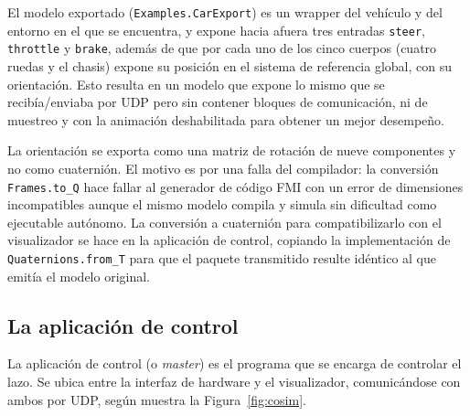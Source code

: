 El modelo exportado (\verb|Examples.CarExport|) es un wrapper del vehículo y del entorno en el que se encuentra, y expone hacia afuera tres entradas \verb|steer|, \verb|throttle| y \verb|brake|, además de que por cada uno de los cinco cuerpos (cuatro ruedas y el chasis) expone su posición en el sistema de referencia global, con su orientación. Esto resulta en un modelo que expone lo mismo que se recibía/enviaba por UDP pero sin contener bloques de comunicación, ni de muestreo y con la animación deshabilitada para obtener un mejor desempeño.

La orientación se exporta como una matriz de rotación de nueve componentes y no como cuaternión. El motivo es por una falla del compilador: la conversión \verb|Frames.to_Q| hace fallar al generador de código FMI con un error de dimensiones incompatibles aunque el mismo modelo compila y simula sin dificultad como ejecutable autónomo. La conversión a cuaternión para compatibilizarlo con el visualizador se hace en la aplicación de control, copiando la implementación de \verb|Quaternions.from_T| para que el paquete transmitido resulte idéntico al que emitía el modelo original.





\subsection{La aplicación de control}

La aplicación de control (o \textit{master}) es el programa que se encarga de controlar el lazo. Se ubica entre la interfaz de hardware y el visualizador, comunicándose con ambos por UDP, según muestra la Figura~\ref{fig:cosim}.

